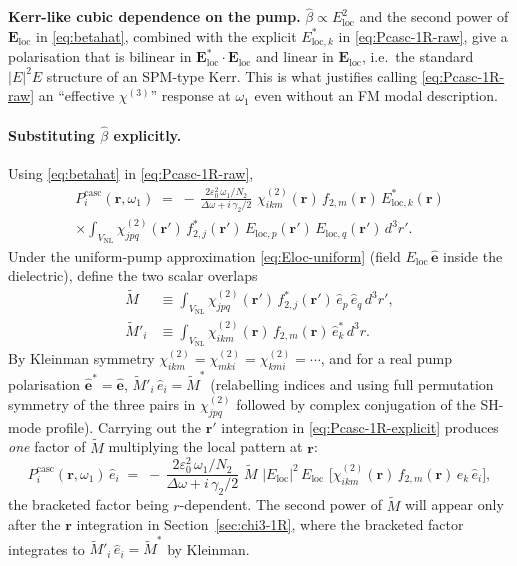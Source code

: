 \documentclass[11pt,a4paper]{article}
\newcommand{\eps}{\varepsilon}
\newcommand{\bvec}[1]{\mathbf{#1}}
\newcommand{\E}{\bvec{E}}
\newcommand{\ri}{\bvec{r}}
\newcommand{\chitwo}{\chi^{(2)}}
\newcommand{\chithree}{\chi^{(3)}}
\newcommand{\Dom}{\Delta\omega}
\newcommand{\Einc}{\E_{\text{loc}}}
\newcommand{\VNL}{V_{\text{NL}}}
\begin{document}
\textbf{Kerr-like cubic dependence on the pump.}
$\hat\beta\propto E_\text{loc}^{2}$ and the second power of $\Einc$ in
\eqref{eq:betahat}, combined with the explicit $E_{\text{loc},k}^{*}$ in
\eqref{eq:Pcasc-1R-raw}, give a polarisation that is bilinear in
$\Einc^{*}\!\cdot\!\Einc$ and linear in $\Einc$, i.e.\ the standard
$|E|^{2}E$ structure of an SPM-type Kerr.  This is what justifies calling
\eqref{eq:Pcasc-1R-raw} an ``effective $\chithree$'' response at $\omega_1$
even without an FM modal description.

\paragraph{Substituting $\hat\beta$ explicitly.}
Using \eqref{eq:betahat} in \eqref{eq:Pcasc-1R-raw},
\begin{multline}
  P_i^{\text{casc}}(\ri,\omega_1)\;=\;
   -\,\frac{2\eps_0^{2}\,\omega_1/N_2}{\Dom+i\,\gamma_2/2}\,\,
     \chitwo_{ikm}(\ri)\,f_{2,m}(\ri)\,E_{\text{loc},k}^{*}(\ri)\\
   \times\!\int_{\VNL}\!\chitwo_{jpq}(\ri')\,f_{2,j}^{*}(\ri')\,
                    E_{\text{loc},p}(\ri')\,E_{\text{loc},q}(\ri')\,d^{3}r'.
  \label{eq:Pcasc-1R-explicit}
\end{multline}
Under the uniform-pump approximation \eqref{eq:Eloc-uniform}
(field $E_\text{loc}\,\hat{\bm e}$ inside the dielectric), define the
two scalar overlaps
\begin{align}
  \widetilde M
   &\equiv\!\int_{\VNL}\!\chitwo_{jpq}(\ri')\,f_{2,j}^{*}(\ri')\,
            \hat e_p\,\hat e_q\,d^{3}r',
   \label{eq:Mtilde-def}\\[3pt]
  \widetilde M'_i
   &\equiv\!\int_{\VNL}\!\chitwo_{ikm}(\ri)\,f_{2,m}(\ri)\,
            \hat e_k^{*}\,d^{3}r.
   \label{eq:Mtildeprime-def}
\end{align}
By Kleinman symmetry $\chitwo_{ikm}=\chitwo_{mki}=\chitwo_{kmi}=\cdots$,
and for a real pump polarisation $\hat{\bm e}^{*}=\hat{\bm e}$,
$\widetilde M'_i\,\hat e_i = \widetilde M^{*}$ (relabelling indices and
using full permutation symmetry of the three pairs in $\chitwo_{jpq}$
followed by complex conjugation of the SH-mode profile).  Carrying out the
$\ri'$ integration in \eqref{eq:Pcasc-1R-explicit} produces \emph{one}
factor of $\widetilde M$ multiplying the local pattern at $\ri$:
\begin{equation}
  P_i^{\text{casc}}(\ri,\omega_1)\,\hat e_i
   \;=\;-\,\frac{2\eps_0^{2}\,\omega_1/N_2}{\Dom+i\,\gamma_2/2}\,
        \,\widetilde M\,\,|E_\text{loc}|^{2}\,E_\text{loc}\,
        \,\bigl[\chitwo_{ikm}(\ri)\,f_{2,m}(\ri)\,\hat e_k\,\hat e_i\bigr],
  \label{eq:Pcasc-1R-collected}
\end{equation}
the bracketed factor being $r$-dependent.  The second power of $\widetilde M$
will appear only after the $\ri$ integration in
Section~\ref{sec:chi3-1R}, where the bracketed factor integrates to
$\widetilde M'_i\,\hat e_i=\widetilde M^{*}$ by Kleinman.
\end{document}
